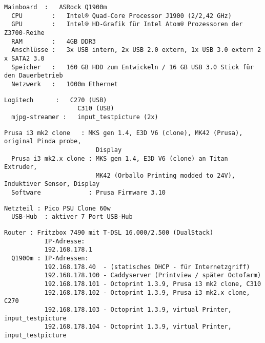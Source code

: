 \vspace{\hwspace}
\begin{Verbatim}[frame=lines,
       framerule=0.2mm,framesep=3mm,
       rulecolor=\color{monoorange},
       fillcolor=\color{monogreen},
       label=Computer,labelposition=topline]
  Mainboard  :   ASRock Q1900m
  CPU        :   Intel® Quad-Core Processor J1900 (2/2,42 GHz)
  GPU        :   Intel® HD-Grafik für Intel Atom® Prozessoren der Z3700-Reihe
  RAM        :   4GB DDR3
  Anschlüsse :   3x USB intern, 2x USB 2.0 extern, 1x USB 3.0 extern 2 x SATA2 3.0
  Speicher   :   160 GB HDD zum Entwickeln / 16 GB USB 3.0 Stick für den Dauerbetrieb
  Netzwerk   :   1000m Ethernet
\end{Verbatim}
\vspace{\hwspace}
\begin{Verbatim}[frame=lines,
       framerule=0.2mm,framesep=3mm,
       rulecolor=\color{monoorange},
       fillcolor=\color{monogreen},
       label=Kameras,labelposition=topline]
  Logitech      :   C270 (USB)
                    C310 (USB)
  mjpg-streamer :   input_testpicture (2x)
\end{Verbatim}
\vspace{\hwspace}
\begin{Verbatim}[frame=lines,
       framerule=0.2mm,framesep=3mm,
       rulecolor=\color{monoorange},
       fillcolor=\color{monogreen},
       label=3D Drucker,labelposition=topline]
  Prusa i3 mk2 clone   : MKS gen 1.4, E3D V6 (clone), MK42 (Prusa), original Pinda probe,
                         Display
  Prusa i3 mk2.x clone : MKS gen 1.4, E3D V6 (clone) an Titan Extruder,
                         MK42 (Orballo Printing modded to 24V), Induktiver Sensor, Display
  Software             : Prusa Firmware 3.10
\end{Verbatim}
\vspace{\hwspace}
\begin{Verbatim}[frame=lines,
       framerule=0.2mm,framesep=3mm,
       rulecolor=\color{monoorange},
       fillcolor=\color{monogreen},
       label=Verschiedenes,labelposition=topline]
  Netzteil : Pico PSU Clone 60w
  USB-Hub  : aktiver 7 Port USB-Hub
\end{Verbatim}
\vspace{\hwspace}
\begin{Verbatim}[frame=lines,
       framerule=0.2mm,framesep=3mm,
       rulecolor=\color{monoorange},
       fillcolor=\color{monogreen},
       label=Netzwerk,labelposition=topline]
  Router : Fritzbox 7490 mit T-DSL 16.000/2.500 (DualStack)
           IP-Adresse:
           192.168.178.1
  Q1900m : IP-Adressen:
           192.168.178.40  - (statisches DHCP - für Internetzgriff)
           192.168.178.100 - Caddyserver (Printview / später Octofarm)
           192.168.178.101 - Octoprint 1.3.9, Prusa i3 mk2 clone, C310
           192.168.178.102 - Octoprint 1.3.9, Prusa i3 mk2.x clone, C270
           192.168.178.103 - Octoprint 1.3.9, virtual Printer, input_testpicture
           192.168.178.104 - Octoprint 1.3.9, virtual Printer, input_testpicture
\end{Verbatim}

